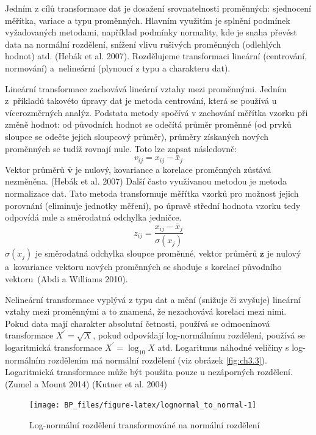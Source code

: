 \documentclass[12pt,]{article}
\begin{document}
\qquad Jedním z cílů transformace dat je dosažení srovnatelnosti
proměnných: sjednocení měřítka, variace a typu proměnných. Hlavním
využitím je splnění podmínek vyžadovaných metodami, například podmínky
normality, kde je snaha převést data na normální rozdělení, snížení
vlivu rušivých proměnných (odlehlých hodnot) atd. (Hebák et al. 2007).
Rozdělujeme transformaci lineární (centrování, normování) a~nelineární
(plynoucí z typu a charakteru dat).

\qquad Lineární transformace zachovává lineární vztahy mezi proměnnými.
Jedním z~příkladů takovéto úpravy dat je metoda centrování, která se
používá u vícerozměrných analýz. Podstata metody spočívá v zachování
měřítka vzorku při změně hodnot: od původních hodnot se odečítá průměr
proměnné (od prvků sloupce se odečte jejich sloupcový průměr), průměry
získaných nových proměnných se tudíž rovnají nule. Toto lze zapsat
následovně: \[v_{ij} = x_{ij} - \bar{x}_j\] Vektor průměrů
\(\bar{\bm{v}}\) je nulový, kovariance a korelace proměnných zůstává
nezměněna. (Hebák et al. 2007) Další často využívanou metodou je metoda
normalizace dat. Tato metoda transformuje měřítka vzorků pro možnost
jejich porovnání (eliminuje jednotky měření), po úpravě střední hodnota
vzorku tedy odpovídá nule a směrodatná odchylka jedničce.
\[z_{ij} = \frac{x_{ij} - \bar{x}_j}{\sigma(x_j)}\] \(\sigma(x_j)\) je
směrodatná odchylka sloupce proměnné, vektor průměrů \(\bar{\bm{z}}\) je
nulový a~kovariance vektoru nových proměnných se shoduje s korelací
původního vektoru~(Abdi a Williams 2010).

\qquad Nelineární transformace vyplývá z typu dat a mění (snižuje či
zvyšuje) lineární vztahy mezi proměnnými a to znamená, že nezachovává
korelaci mezi nimi. Pokud data mají charakter absolutní četnosti,
používá se odmocninová transformace \(X^{\prime} = \sqrt{X}\), pokud
odpovídají log-normálnímu rozdělení, používá se logaritmická
transformace \(X^{\prime} = \log_{10}X\) atd. Logaritmus náhodné
veličiny s log-normálním rozdělením má normální rozdělení (viz obrázek
\ref{fig:ch3.3}). Logaritmická transformace může být použita pouze u
nezáporných rozdělení. (Zumel a Mount 2014) (Kutner et al. 2004)

\begin{figure}[H]

{\centering \texttt{[image: BP\_files/figure-latex/lognormal\_to\_normal-1]} 

}

\caption{\label{fig:ch3.3} Log-normální rozdělení transformováné na normální rozdělení}\label{fig:lognormal_to_normal}
\end{figure}
\end{document}
